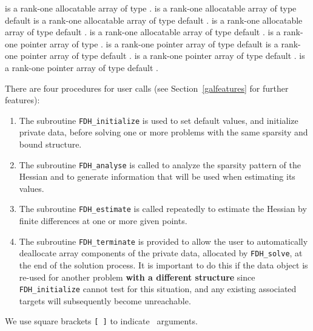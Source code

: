 \documentclass{galahad}
\newcommand{\packagename}{FDH}
\begin{document}
\begin{description}
 is a rank-one allocatable array of type \integer.
 is a rank-one allocatable array of type default  \realdp
{} is a rank-one allocatable array of type default \complexdp.
 is a rank-one allocatable array of type default \character.
 is a rank-one allocatable array of type default \logical.
 is a rank-one pointer array of type \integer.
 is a rank-one pointer array of type default  \realdp
{} is a rank-one pointer array of type default \complexdp.
 is a rank-one pointer array of type default \character.
 is a rank-one pointer array of type default \logical.
\end{description}


\galarguments
There are four procedures for user calls
(see Section~\ref{galfeatures} for further features): 

\begin{enumerate}
\item The subroutine 
      {\tt \packagename\_initialize} 
      is used to set default values, and initialize private data, 
      before solving one or more problems with the
      same sparsity and bound structure.
\item The subroutine 
      {\tt \packagename\_analyse} 
      is called to analyze the sparsity pattern of the Hessian
      and to generate information that will be used when estimating 
      its values.
\item The subroutine 
      {\tt \packagename\_estimate} 
      is called repeatedly to estimate the Hessian by finite differences at 
      one or more given points.
\item The subroutine 
      {\tt \packagename\_terminate} 
      is provided to allow the user to automatically deallocate array 
       components of the private data, allocated by 
       {\tt \packagename\_solve}, 
       at the end of the solution process. 
       It is important to do this if the data object is re-used for another 
       problem {\bf with a different structure}
       since {\tt \packagename\_initialize} cannot test for this situation, 
       and any existing associated targets will subsequently become unreachable.
\end{enumerate}
We use square brackets {\tt [ ]} to indicate \optional\ arguments.
\end{document}
